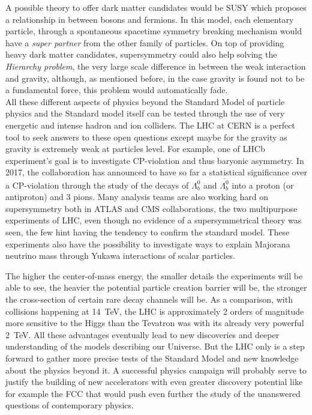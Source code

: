 	A possible theory to offer dark matter candidates would be \acl{SUSY} which proposes a relationship in between bosons and fermions. In this model, each elementary particle, through a spontaneous spacetime symmetry breaking mechanism would have a \textit{super partner} from the other family of particles. On top of providing heavy dark matter candidates, supersymmetry could also help solving the \textit{Hierarchy problem}, the very large scale difference in between the weak interaction and gravity, although, as mentioned before, in the case gravity is found not to be a fundamental force, this problem would automatically fade.\\
	
	All these different aspects of physics beyond the Standard Model of particle physics and the Standard model itself can be tested through the use of very energetic and intense hadron and ion colliders. The LHC at CERN is a perfect tool to seek answers to these open questions except maybe for the gravity as gravity is extremely weak at particles level. For example, one of LHCb experiment's goal is to investigate CP-violation and thus baryonic asymmetry. In 2017, the collaboration has announced to have so far a  statistical significance over a CP-violation through the study of the decays of $\Lambda^0_b$ and $\overline{\Lambda^0_b}$ into a proton (or antiproton) and 3 pions. Many analysis teams are also working hard on supersymmetry both in ATLAS and CMS collaborations, the two multipurpose experiments of LHC, even though no evidence of a supersymmetrical theory was seen, the few hint having the tendency to confirm the standard model. These experiments also have the possibility to investigate ways to explain Majorana neutrino mass through Yukawa interactions of scalar particles.
	
	The higher the center-of-mass energy, the smaller details the experiments will be able to see, the heavier the potential particle creation barrier will be, the stronger the cross-section of certain rare decay channels will be. As a comparison, with collisions happening at \SI{14}{TeV}, the LHC is approximately 2 orders of magnitude more sensitive to the Higgs than the Tevatron was with its already very powerful \SI{2}{TeV}. All these advantages eventually lead to new discoveries and deeper understanding of the models describing our Universe. But the LHC only is a step forward to gather more precise tests of the Standard Model and new knowledge about the physics beyond it. A successful physics campaign will probably serve to justify the building of new accelerators with even greater discovery potential like for example the \acf{FCC} that would push even further the study of the unanswered questions of contemporary physics.

